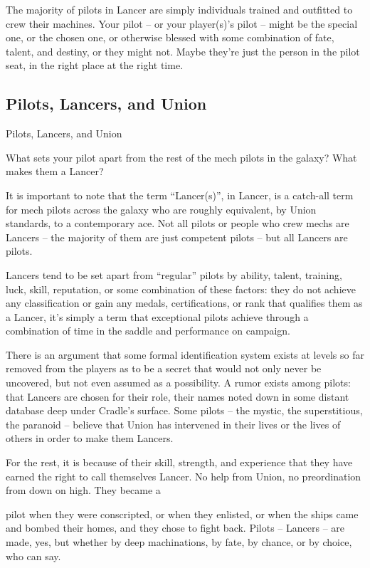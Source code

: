 The majority of pilots in Lancer are simply individuals trained and outfitted to crew their
machines. Your pilot -- or your player(s)’s pilot -- might be the special one, or the chosen one, or
otherwise blessed with some combination of fate, talent, and destiny, or they might not. Maybe
they’re just the person in the pilot seat, in the right place at the right time.

\subsection{Pilots, Lancers, and Union}
Pilots, Lancers, and Union

What sets your pilot apart from the rest of the mech pilots in the galaxy? What makes them a
Lancer?

It is important to note that the term “Lancer(s)”, in Lancer, is a catch-all term for mech pilots
across the galaxy who are roughly equivalent, by Union standards, to a contemporary ace. Not all
pilots or people who crew mechs are Lancers -- the majority of them are just competent pilots --
but all Lancers are pilots.

Lancers tend to be set apart from “regular” pilots by ability, talent, training, luck, skill, reputation, or
some combination of these factors: they do not achieve any classification or gain any medals,
certifications, or rank that qualifies them as a Lancer, it’s simply a term that exceptional pilots
achieve through a combination of time in the saddle and performance on campaign.

There is an argument that some formal identification system exists at levels so far removed from
the players as to be a secret that would not only never be uncovered, but not even assumed as a
possibility. A rumor exists among pilots: that Lancers are chosen for their role, their names noted
down in some distant database deep under Cradle’s surface. Some pilots -- the mystic, the
superstitious, the paranoid -- believe that Union has intervened in their lives or the lives of others
in order to make them Lancers.

For the rest, it is because of their skill, strength, and experience that they have earned the right to
call themselves Lancer. No help from Union, no preordination from down on high. They became a




pilot when they were conscripted, or when they enlisted, or when the ships came and bombed
their homes, and they chose to fight back. Pilots -- Lancers -- are made, yes, but whether by deep
machinations, by fate, by chance, or by choice, who can say.

